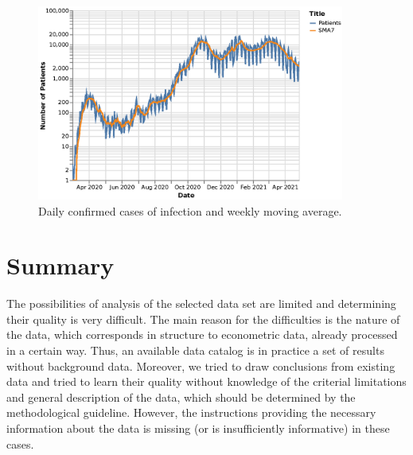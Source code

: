 \begin{figure}[htb]
    \centering
    \includegraphics[width=0.9\textwidth]{figures/recovered-sma7.eps}
    \caption{Daily confirmed cases of infection and weekly moving average.}
    \label{fig:recovered-sma7}
\end{figure}
\FloatBarrier

\section{Summary}

The possibilities of analysis of the selected data set are limited and determining their quality is very difficult.
The main reason for the difficulties is the nature of the data, which corresponds in structure to econometric data, already processed in a certain way.
Thus, an available data catalog is in practice a set of results without background data.
Moreover, we tried to draw conclusions from existing data and tried to learn their quality without knowledge of the criterial limitations and general description of the data, which should be determined by the methodological guideline.
However, the instructions providing the necessary information about the data is missing (or is insufficiently informative) in these cases.
